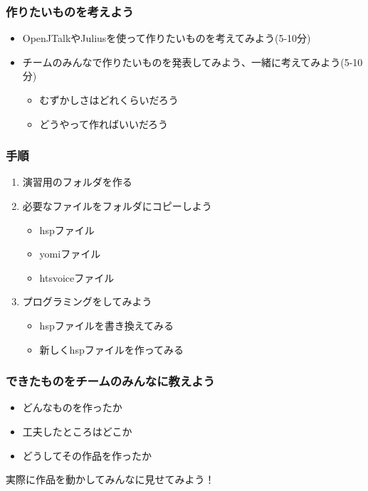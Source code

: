 \documentclass[14pt]{beamer}
\begin{document}
\begin{frame}
  \frametitle{作りたいものを考えよう}
  \begin{itemize}
    \item OpenJTalkやJuliusを使って作りたいものを考えてみよう(5-10分)
    \item チームのみんなで作りたいものを発表してみよう、一緒に考えてみよう(5-10分)
    \begin{itemize}
      \item むずかしさはどれくらいだろう
      \item どうやって作ればいいだろう
    \end{itemize}
  \end{itemize}
\end{frame}
\begin{frame}
  \frametitle{手順}
  \begin{enumerate}
    \item 演習用のフォルダを作る
    \item 必要なファイルをフォルダにコピーしよう
    \begin{itemize}
      \item hspファイル
      \item yomiファイル
      \item htsvoiceファイル
    \end{itemize}
    \item プログラミングをしてみよう
    \begin{itemize}
      \item hspファイルを書き換えてみる
      \item 新しくhspファイルを作ってみる
    \end{itemize}
  \end{enumerate}
\end{frame}

\begin{frame}
  \frametitle{できたものをチームのみんなに教えよう}
  \begin{itemize}
    \item どんなものを作ったか
    \item 工夫したところはどこか
    \item どうしてその作品を作ったか
  \end{itemize}
  実際に作品を動かしてみんなに見せてみよう！
\end{frame}
\end{document}
